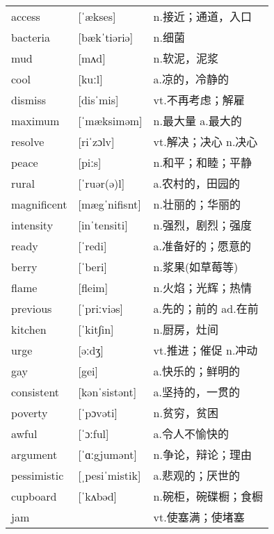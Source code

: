 \documentclass[a4paper]{article}
\begin{document}
\section{}
\begin{tabular}{l l l}

access & [ˈækses] & n.接近；通道，入口 \\
bacteria & [bækˈtiəriə] & n.细菌 \\
mud & [mʌd] & n.软泥，泥浆 \\
cool & [kuːl] & a.凉的，冷静的 \\
dismiss & [disˈmis] & vt.不再考虑；解雇 \\
maximum & [ˈmæksiməm] & n.最大量 a.最大的 \\
resolve & [riˈzɔlv] & vt.解决；决心 n.决心 \\
peace & [piːs] & n.和平；和睦；平静 \\
rural & [ˈruər(ə)l] & a.农村的，田园的 \\
magnificent & [mægˈnifisnt] & n.壮丽的；华丽的 \\
intensity & [inˈtensiti] & n.强烈，剧烈；强度 \\
ready & [ˈredi] & a.准备好的；愿意的 \\
berry & [ˈberi] & n.浆果(如草莓等) \\
flame & [fleim] & n.火焰；光辉；热情 \\
previous & [ˈpriːviəs] & a.先的；前的 ad.在前 \\
kitchen & [ˈkit∫in] & n.厨房，灶间 \\
urge & [əːdʒ] & vt.推进；催促 n.冲动 \\
gay & [gei] & a.快乐的；鲜明的 \\
consistent & [kənˈsistənt] & a.坚持的，一贯的 \\
poverty & [ˈpɔvəti] & n.贫穷，贫困 \\
awful & [ˈɔːful] & a.令人不愉快的 \\
argument & [ˈɑːgjumənt] & n.争论，辩论；理由 \\
pessimistic & [ˌpesiˈmistik] & a.悲观的；厌世的 \\
cupboard & [ˈkʌbəd] & n.碗柜，碗碟橱；食橱 \\
jam &  & vt.使塞满；使堵塞 \\

\end{tabular}
\end{document}
